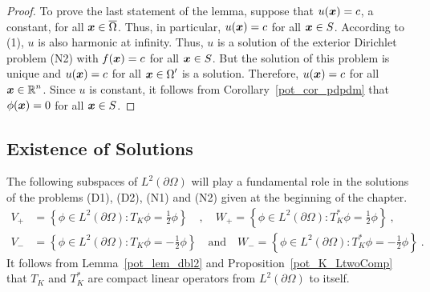 \begin{proof}
To prove the last statement of the lemma, suppose that
$u({\bm{x}}) = c$, a constant, for all ${\bm{x}} \in \overline{\Omega}$.
Thus, in particular, $u({\bm{x}}) = c$ for all ${\bm{x}} \in S$.
According to (1), $u$ is also harmonic at infinity.  Thus, $u$ is a
solution of the exterior Dirichlet problem (N2) with $f({\bm{x}}) = c$
for all ${\bm{x}} \in S$.   But the solution of this problem is
unique and $u({\bm{x}}) = c$ for all
$\displaystyle {\bm{x}} \in \Omega^{\prime}$ is a
solution.  Therefore, $u({\bm{x}}) = c$ for all
$\displaystyle {\bm{x}} \in \mathbb{R}^n$.
Since $u$ is constant, it follows from Corollary~\ref{pot_cor_pdpdm}
that $\phi({\bm{x}}) = 0$ for all ${\bm{x}} \in S$.
\end{proof}

\subsection{Existence of Solutions}

The following subspaces of $\displaystyle L^2(\partial \Omega)$ will play a
fundamental role in the solutions of the problems (D1), (D2), (N1) and
(N2) given at the beginning of the chapter.
\begin{align*}
V_+ &= \left\{ \phi \in L^2(\partial \Omega) : T_K \phi = \frac{1}{2}
\phi \right\} \quad , \quad
W_+ = \left\{ \phi \in L^2(\partial \Omega) : T_K^\ast \phi = \frac{1}{2}
\phi \right\} \ , \\
V_- &= \left\{ \phi \in L^2(\partial \Omega) : T_K \phi = - \frac{1}{2}
\phi \right\} \quad \text{and} \quad
W_- = \left\{ \phi \in L^2(\partial \Omega) : T_K^\ast \phi = -\frac{1}{2}
\phi \right\} \ .
\end{align*}
It follows from Lemma~\ref{pot_lem_dbl2} and
Proposition~\ref{pot_K_LtwoComp} that $T_K$ and
$\displaystyle T_K^\ast$ are compact
linear operators from $\displaystyle L^2(\partial \Omega)$ to itself.

